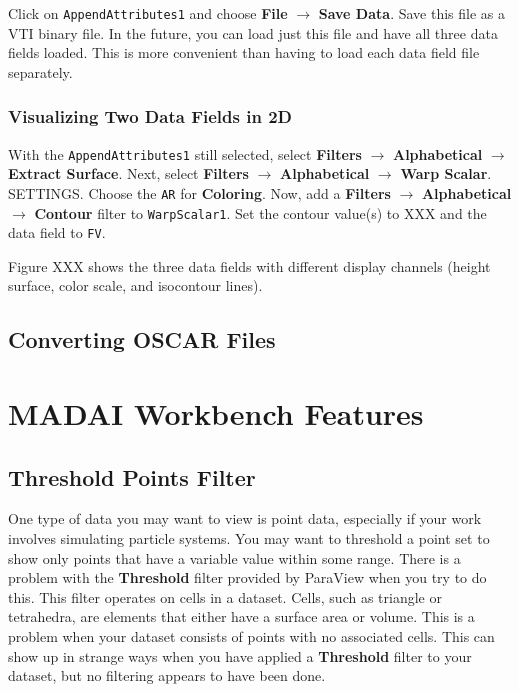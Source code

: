 \documentclass[12pt]{article}
\newcommand{\filter}[1]{\textbf{#1}}
\newcommand{\filterinstance}[1]{\texttt{#1}}
\newcommand{\menu}[1]{\textbf{#1}}
\newcommand{\setting}[1]{\textbf{#1}}
\newcommand{\field}[1]{\texttt{#1}}
\begin{document}
Click on \filterinstance{AppendAttributes1} and choose \menu{File} $\rightarrow$ \menu{Save Data}. Save this file as a VTI binary file. In the future, you can load just this file and have all three data fields loaded. This is more convenient than having to load each data field file separately.

\subsubsection{Visualizing Two Data Fields in 2D}

With the \filterinstance{AppendAttributes1} still selected, select \filter{Filters} $\rightarrow$ \filter{Alphabetical} $\rightarrow$ \filter{Extract Surface}. Next, select \filter{Filters} $\rightarrow$ \filter{Alphabetical} $\rightarrow$ \filter{Warp Scalar}. SETTINGS. Choose the \field{AR} for \setting{Coloring}. Now, add a \menu{Filters} $\rightarrow$ \menu{Alphabetical} $\rightarrow$ \menu{Contour} filter to \filterinstance{WarpScalar1}. Set the contour value(s) to XXX and the data field to \field{FV}.

Figure XXX shows the three data fields with different display channels (height surface, color scale, and isocontour lines).

\subsection{Converting OSCAR Files}

\section{MADAI Workbench Features}

\subsection{Threshold Points Filter}

One type of data you may want to view is point data, especially if your work involves simulating particle systems. You may want to threshold a point set to show only points that have a variable value within some range. There is a problem with the \filter{Threshold} filter provided by ParaView when you try to do this. This filter operates on cells in a dataset. Cells, such as triangle or tetrahedra, are elements that either have a surface area or volume. This is a problem when your dataset consists of points with no associated cells. This can show up in strange ways when you have applied a \filter{Threshold} filter to your dataset, but no filtering appears to have been done.
\end{document}
